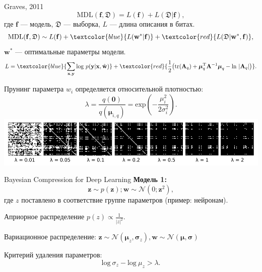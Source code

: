 \documentclass[10pt,pdf,utf8,russian,aspectratio=169]{beamer}
\begin{document}
\begin{frame}{Graves, 2011}
\small
\[
\text{MDL}(\mathbf{f}, \mathfrak{D}) = L(\mathbf{f}) + L(\mathfrak{D}|\mathbf{f}),
\]
где $\mathbf{f}$ --- модель, $\mathfrak{D}$ --- выборка, $L$ --- длина описания в битах.
\\
\[
\text{MDL}(\mathbf{f}, \mathfrak{D}) \sim L(\mathbf{f}) + \textcolor{blue}{L(\mathbf{w}^*| \mathbf{f})} + \textcolor{red}{L(\mathfrak{D}|\mathbf{w}^*, \mathbf{f})},
\]
$\mathbf{w}^*$ --- оптимальные параметры модели.\\


$$
L =   \textcolor{blue}{\sum_{\mathbf{x}, \mathbf{y}} \text{log}~p(\mathbf{y}|\mathbf{x}, \hat{\mathbf{w}})} + \textcolor{red}{\frac{1}{2} \bigl( \text{tr} (\mathbf{A}_q) + \boldsymbol{\mu}_q^\text{T}\mathbf{A}^{-1}\boldsymbol{\mu}_q  - \text{ln}~|\mathbf{A}_q| \bigr)}.
$$


Прунинг параметра ${w}_i$ определяется относительной плотностью:
\[
	\lambda = \frac{q(\mathbf{0})}{q(\boldsymbol{\mu}_{i,q})}  = \text{exp}(-\frac{\mu_i^2}{2\sigma_i^2}).
\]
\includegraphics[width=\textwidth]{graves.png}

\end{frame}


\begin{frame}{Bayesian Compression for Deep Learning}
\textbf{Модель 1:}
\[
    \mathbf{z} \sim p(\mathbf{z}); \mathbf{w} \sim \mathcal{N}(0; \mathbf{z}^2),
\]
где $z$ поставлено в соответствие группе параметров (пример: нейронам).

Априорное распределение $p(z) \propto \frac{1}{|z|^2}$.

Вариационное распределение: 
$
    \mathbf{z} \sim \mathcal{N}(\boldsymbol{\mu}_z, \boldsymbol{\sigma}_z), \mathbf{w} \sim  \mathcal{N}(\boldsymbol{\mu}, \boldsymbol{\sigma})
$ 

Критерий удаления параметров:
\[
    \text{log}~{\sigma_z} - \text{log}~{\mu_z} > \lambda.
\]


\end{frame}
\end{document}
